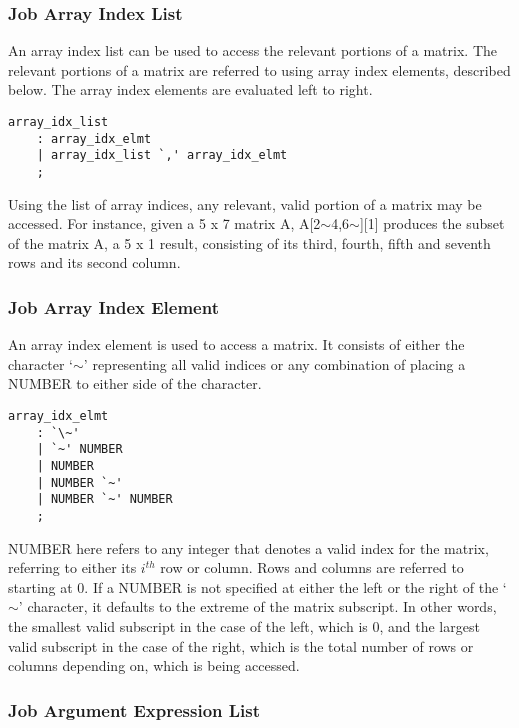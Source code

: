 \documentclass[prodmode,acmtecs]{acmsmall}
\begin{document}
\subsubsection{Job Array Index List}

An array index list can be used to access the relevant portions of a matrix. 
The relevant portions of a matrix are referred to using array index elements, 
described below. The array index elements are evaluated left to right.

\begin{lstlisting}
array_idx_list
	: array_idx_elmt
	| array_idx_list `,' array_idx_elmt
	;
\end{lstlisting}

Using the list of array indices, any relevant, valid portion of a matrix may
be accessed. For instance, given a 5 x 7 matrix A, A[2$\sim$4,6$\sim$][1] produces the
subset of the matrix A, a 5 x 1 result, consisting of its third, fourth, 
fifth and seventh rows and its second column.
\medskip

\subsubsection{Job Array Index Element}

An array index element is used to access a matrix. It consists of either 
the character `$\sim$' representing all valid indices or any combination of placing
a NUMBER to either side of the character. 

\begin{lstlisting}
array_idx_elmt
	: `\~'
	| `~' NUMBER
	| NUMBER
	| NUMBER `~'
	| NUMBER `~' NUMBER
	;
\end{lstlisting}

NUMBER here refers to any integer that denotes a valid index for the 
matrix, referring to either its $i^{th}$ row or column. Rows and columns are 
referred to starting at 0. If a NUMBER is not specified at either 
the left or the right of the `$\sim$' character, it defaults to the extreme 
of the matrix subscript. In other words, the smallest valid subscript in 
the case of the left, which is 0, and the largest valid subscript in the 
case of the right, which is the total number of rows or columns depending
on, which is being accessed.
\medskip

\subsubsection{Job Argument Expression List}
\end{document}
